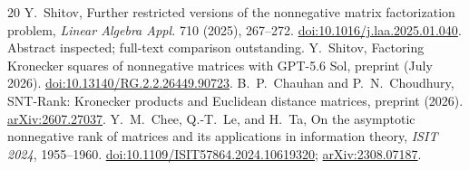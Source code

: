 \documentclass[11pt]{article}
\theoremstyle{definition}\newtheorem{definition}[theorem]{Definition}
\theoremstyle{remark}\newtheorem{remark}[theorem]{Remark}
\begin{document}
\begin{thebibliography}{20}
 Y.~Shitov, Further restricted versions of the nonnegative matrix factorization problem, \emph{Linear Algebra Appl.} 710 (2025), 267--272. \href{https://doi.org/10.1016/j.laa.2025.01.040}{doi:10.1016/j.laa.2025.01.040}. Abstract inspected; full-text comparison outstanding.
 Y.~Shitov, Factoring Kronecker squares of nonnegative matrices with GPT-5.6 Sol, preprint (July 2026). \href{https://doi.org/10.13140/RG.2.2.26449.90723}{doi:10.13140/RG.2.2.26449.90723}.
 B.~P.~Chauhan and P.~N.~Choudhury, SNT-Rank: Kronecker products and Euclidean distance matrices, preprint (2026). \href{https://arxiv.org/abs/2607.27037}{arXiv:2607.27037}.
 Y.~M.~Chee, Q.-T.~Le, and H.~Ta, On the asymptotic nonnegative rank of matrices and its applications in information theory, \emph{ISIT 2024}, 1955--1960. \href{https://doi.org/10.1109/ISIT57864.2024.10619320}{doi:10.1109/ISIT57864.2024.10619320}; \href{https://arxiv.org/abs/2308.07187}{arXiv:2308.07187}.
\end{thebibliography}
\end{document}

